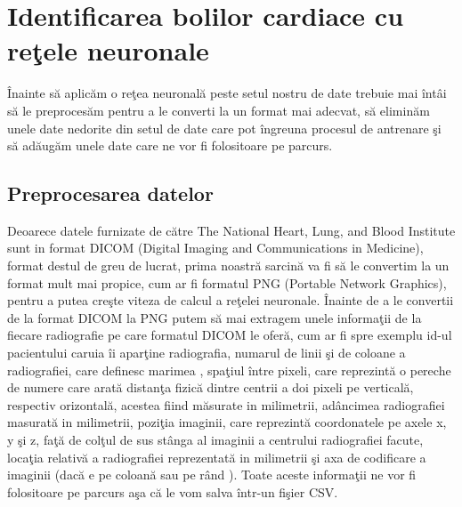 \chapter{Identificarea bolilor cardiace cu re\c{t}ele neuronale}

\^{I}nainte s\u{a} aplic\u{a}m o re\c{t}ea neuronal\u{a} peste setul nostru de date trebuie mai \^{i}nt\^{a}i s\u{a} le preproces\u{a}m pentru a le converti la un format mai adecvat, s\u{a} elimin\u{a}m unele date nedorite din setul de date care pot \^{i}ngreuna procesul de antrenare \c{s}i s\u{a} ad\u{a}ug\u{a}m unele date care ne vor fi folositoare pe parcurs.

\section{Preprocesarea datelor}

Deoarece datele furnizate de c\u{a}tre The National Heart, Lung, and Blood Institute sunt in format DICOM (Digital Imaging and Communications in Medicine), format destul de greu de lucrat, prima noastr\u{a} sarcin\u{a} va fi s\u{a} le convertim la un format mult mai propice, cum ar fi formatul PNG (Portable Network Graphics), pentru a putea cre\c{s}te viteza de calcul a re\c{t}elei neuronale. \^{I}nainte de a le convertii de la format DICOM la PNG putem s\u{a} mai extragem unele informa\c{t}ii de la fiecare radiografie pe care formatul DICOM le ofer\u{a}, cum ar fi spre exemplu  id-ul pacientului caruia \^{i}i apar\c{t}ine radiografia, numarul de linii \c{s}i de coloane a radiografiei, care definesc marimea , spa\c{t}iul \^{i}ntre pixeli, care reprezint\u{a} o pereche de numere care arat\u{a} distan\c{t}a fizic\u{a} dintre centrii a doi pixeli pe vertical\u{a}, respectiv orizontal\u{a}, acestea fiind m\u{a}surate in milimetrii, ad\^{a}ncimea radiografiei masurat\u{a} in milimetrii, pozi\c{t}ia imaginii, care reprezint\u{a} coordonatele pe axele x, y \c{s}i z, fa\c{t}\u{a} de col\c{t}ul de sus st\^{a}nga al imaginii a centrului  radiografiei facute, loca\c{t}ia relativ\u{a} a radiografiei reprezentat\u{a} in milimetrii \c{s}i axa de codificare a imaginii (dac\u{a} e pe coloan\u{a} sau pe r\^{a}nd ). Toate aceste informa\c{t}ii ne vor fi folositoare pe parcurs a\c{s}a c\u{a} le vom salva \^{i}ntr-un fi\c{s}ier CSV.

\par

